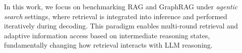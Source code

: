 In this work, we focus on benchmarking RAG and GraphRAG under \emph{agentic search} settings, where retrieval is integrated into inference and performed iteratively during decoding. This paradigm enables multi-round retrieval and adaptive information access based on intermediate reasoning states, fundamentally changing how retrieval interacts with LLM reasoning.
